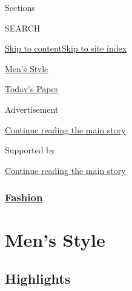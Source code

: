 Sections

SEARCH

\protect\hyperlink{site-content}{Skip to
content}\protect\hyperlink{site-index}{Skip to site index}

\href{https://www.nytimes.com/section/fashion/mens-style}{Men's Style}

\href{https://myaccount.nytimes.com/auth/login?response_type=cookie\&client_id=vi}{}

\href{https://www.nytimes.com/section/todayspaper}{Today's Paper}

Advertisement

\protect\hyperlink{after-top}{Continue reading the main story}

Supported by

\protect\hyperlink{after-sponsor}{Continue reading the main story}

\hypertarget{fashion}{%
\subsubsection{\texorpdfstring{\href{/section/fashion}{Fashion}}{Fashion}}\label{fashion}}

\hypertarget{mens-style}{%
\section{Men's Style}\label{mens-style}}

\hypertarget{highlights}{%
\subsection{Highlights}\label{highlights}}

